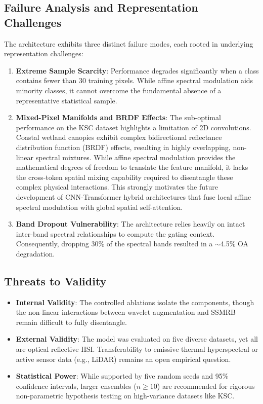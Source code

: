 \documentclass[pdflatex,sn-mathphys-num]{sn-jnl}
\theoremstyle{thmstyleone}
\theoremstyle{thmstyletwo}
\theoremstyle{thmstylethree}
\begin{document}
\subsection{Failure Analysis and Representation Challenges}\label{sec:failure}
The architecture exhibits three distinct failure modes, each rooted in underlying representation challenges:
\begin{enumerate}
 \item \textbf{Extreme Sample Scarcity}: Performance degrades significantly when a class contains fewer than 30 training pixels. While affine spectral modulation aids minority classes, it cannot overcome the fundamental absence of a representative statistical sample.
 \item \textbf{Mixed-Pixel Manifolds and BRDF Effects}: The sub-optimal performance on the KSC dataset highlights a limitation of 2D convolutions. Coastal wetland canopies exhibit complex bidirectional reflectance distribution function (BRDF) effects, resulting in highly overlapping, non-linear spectral mixtures. While affine spectral modulation provides the mathematical degrees of freedom to translate the feature manifold, it lacks the cross-token spatial mixing capability required to disentangle these complex physical interactions. This strongly motivates the future development of CNN-Transformer hybrid architectures that fuse local affine spectral modulation with global spatial self-attention.
 \item \textbf{Band Dropout Vulnerability}: The architecture relies heavily on intact inter-band spectral relationships to compute the gating context. Consequently, dropping 30\% of the spectral bands resulted in a $\sim$4.5\% OA degradation.
\end{enumerate}

\subsection{Threats to Validity}
\begin{itemize}
 \item \textbf{Internal Validity}: The controlled ablations isolate the components, though the non-linear interactions between wavelet augmentation and SSMRB remain difficult to fully disentangle.
 \item \textbf{External Validity}: The model was evaluated on five diverse datasets, yet all are optical reflective HSI. Transferability to emissive thermal hyperspectral or active sensor data (e.g., LiDAR) remains an open empirical question.
 \item \textbf{Statistical Power}: While supported by five random seeds and 95\% confidence intervals, larger ensembles ($n \geq 10$) are recommended for rigorous non-parametric hypothesis testing on high-variance datasets like KSC.
\end{itemize}
\end{document}
